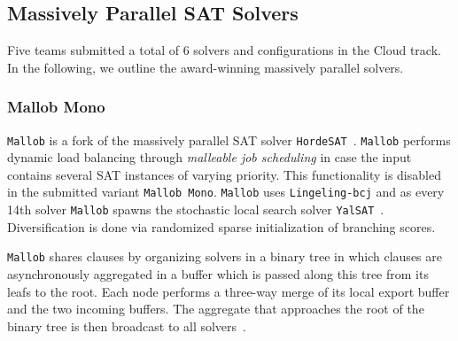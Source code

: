 \documentclass{elsarticle}
\newcommand{\solver}[1]{\texttt{#1}}
\begin{document}
\subsection{Massively Parallel SAT Solvers}
\label{sec:part:cloud}

Five teams submitted a total of $6$ solvers and configurations in the Cloud track. 
In the following, we outline the award-winning massively parallel solvers. 



\subsubsection{Mallob Mono}

\solver{Mallob} is a fork of the  massively parallel SAT solver \solver{HordeSAT}~\cite{Balyo:2015:HordeSATs}. 
\solver{Mallob} performs dynamic load balancing through \emph{malleable job scheduling} in case the input contains several SAT instances of varying priority. 
This functionality is disabled in the submitted variant \solver{Mallob Mono}. 
\solver{Mallob} uses \solver{Lingeling-bcj} and as every 14th solver \solver{Mallob} spawns the stochastic local search solver \solver{YalSAT}~\cite{Biere:2018:LingelingYalsat}.
Diversification is done via randomized sparse initialization of branching scores. 

\solver{Mallob} shares clauses by organizing solvers in a binary tree in which clauses are asynchronously aggregated in a buffer which is passed along this tree from its leafs to the root. 
Each node performs a three-way merge of its local export buffer and the two incoming buffers. 
The aggregate that approaches the root of the binary tree is then broadcast to all solvers~\cite{Schreiber:SC2020}. 
\end{document}
